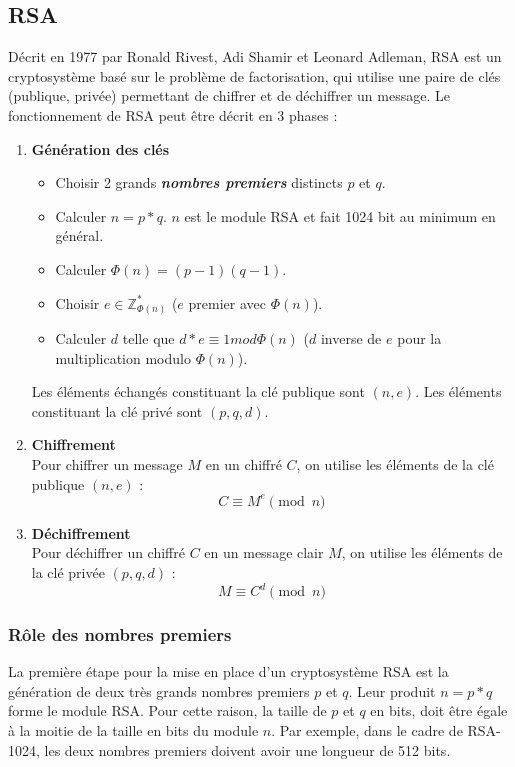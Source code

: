 		\subsection{RSA}
		Décrit en 1977 par Ronald Rivest, Adi Shamir et Leonard Adleman, RSA est un cryptosystème basé sur le problème de factorisation, qui utilise une paire de clés (publique, privée) permettant de chiffrer et de déchiffrer un message. Le fonctionnement de RSA peut être décrit en 3 phases :
			\begin{enumerate}[leftmargin=2em]
				\vspace{1em}
				\item \textbf{Génération des clés} 
				\begin{itemize}
					\item Choisir 2 grands \textbf{\textit{nombres premiers}} distincts $p$ et $q$.
					\item Calculer $n = p * q$. $n$ est le module RSA et fait 1024 bit au minimum en général.
					\item Calculer $\Phi(n) = (p - 1)(q - 1)$.
					\item Choisir $e \in \mathbb{Z}_{\Phi(n)}^{*}$ ($e$ premier avec $\Phi(n)$).
					\item Calculer $d$ telle que $d*e \equiv 1 mod \Phi(n)$ ($d$ inverse de $e$ pour la multiplication modulo $\Phi(n)$).
				\end{itemize}
				Les éléments échangés constituant la clé publique sont $(n, e)$. Les éléments constituant la clé privé sont $(p, q, d)$.
				\vspace{1em}
				\item \textbf{Chiffrement}\\
				Pour chiffrer un message $M$ en un chiffré $C$, on utilise les éléments de la clé publique $(n, e)$ :
				\[C \equiv M^{e} \pmod n\]		
				
				\item \textbf{Déchiffrement}\\
				Pour déchiffrer un chiffré $C$ en un message clair $M$, on utilise les éléments de la clé privée $(p, q, d)$ :
				\[M \equiv C^{d} \pmod n\]
			\end{enumerate}
			
			\subsubsection*{Rôle des nombres premiers}
			La première étape pour la mise en place d'un cryptosystème RSA est la génération de deux très grands nombres premiers $p$ et $q$. Leur produit $n = p * q$ forme le module RSA. Pour cette raison, la taille de $p$ et $q$ en bits, doit être égale à la moitie de la taille en bits du module $n$. Par exemple, dans le cadre de RSA-1024, les deux nombres premiers doivent avoir une longueur de 512 bits.
